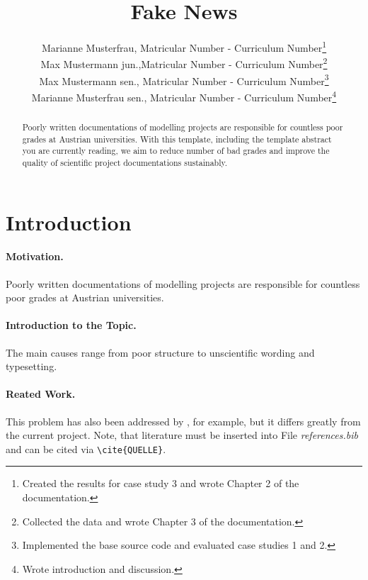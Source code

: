 \documentclass[a4paper,11pt]{scrartcl}
\begin{document}
\subject{LVA-Modeling and Simulation}
\title{Fake News}

\publishers{Supervisor: Max Mustermann}
\author{Marianne Musterfrau, Matricular Number - Curriculum Number\footnote{Created the results for case study 3 and wrote Chapter 2 of the documentation.}\\
Max Mustermann jun.,Matricular Number - Curriculum Number\footnote{Collected the data and wrote Chapter 3 of the documentation.}\\
Max Mustermann sen., Matricular Number - Curriculum Number\footnote{Implemented the base source code and evaluated case studies 1 and 2.}\\
Marianne Musterfrau sen., Matricular Number - Curriculum Number\footnote{Wrote introduction and discussion.}}

\maketitle

\begin{abstract}
Poorly written documentations of modelling projects are responsible for countless poor grades at Austrian universities. With this template, including the template abstract you are currently reading, we aim to reduce number of bad grades and improve the quality of scientific project documentations sustainably.
\end{abstract}

\newpage

\tableofcontents

\newpage

\section{Introduction}
\paragraph{Motivation.} 
Poorly written documentations of modelling projects are responsible for countless poor grades at Austrian universities. 
\paragraph{Introduction to the Topic.} The main causes range from poor structure to unscientific wording and typesetting.
\paragraph{Reated Work.} This problem has also been addressed by \cite{zeigler2000theory}, for example, but it differs greatly from the current project. Note, that literature must be inserted into File \textit{references.bib} and can be cited via \verb|\cite{QUELLE}|.
\end{document}
